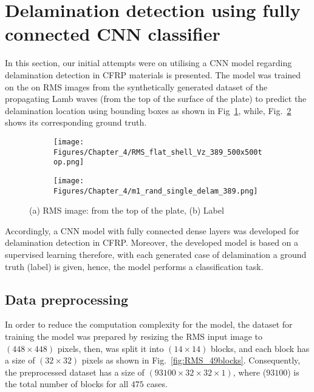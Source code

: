 \section{Delamination detection using fully connected CNN classifier}
\label{sec42}

In this section, our initial attempts were on utilising a CNN model regarding delamination detection in CFRP materials is presented.
The model was trained on the on RMS images from the synthetically generated dataset of the propagating Lamb waves (from the top of the surface of the plate) to predict the delamination location using bounding boxes as shown in Fig~\ref{fig:RMS_14}, while, Fig.~\ref{fig:label_14} shows its corresponding ground truth.
\begin{figure} [h!]
	\centering
	\begin{subfigure}[b]{0.47\textwidth}
		\centering
		\texttt{[image: Figures/Chapter\_4/RMS\_flat\_shell\_Vz\_389\_500x500top.png]}
		\caption{}
		\label{fig:RMS_14}
	\end{subfigure}
	\hfill
	\begin{subfigure}[b]{0.47\textwidth}
		\centering
		\texttt{[image: Figures/Chapter\_4/m1\_rand\_single\_delam\_389.png]}
		\caption{}
		\label{fig:label_14}
	\end{subfigure}
	\caption{(a) RMS image: from the top of the plate, (b) Label}
	\label{fig:RMS_GT}
\end{figure} 

Accordingly, a CNN model with fully connected dense layers was developed for delamination detection in CFRP.
Moreover, the developed model is based on a supervised learning therefore, with each generated case of delamination a ground truth (label) is given, hence, the model performs a classification task.
 
\subsection{Data preprocessing}
In order to reduce the computation complexity for the model, the dataset for training the model was prepared by resizing the RMS input image to \((448\times 448)\) pixels,  then, was split it into \((14\times 14)\) blocks, and each block has a size of \((32\times 32)\) pixels as shown in Fig.~\ref{fig:RMS_49blocks}.
Consequently, the preprocessed dataset has a size of \((93100\times 32\times 32 \times 1)\), where (\(93100\)) is the total number of blocks for all \(475\) cases.

